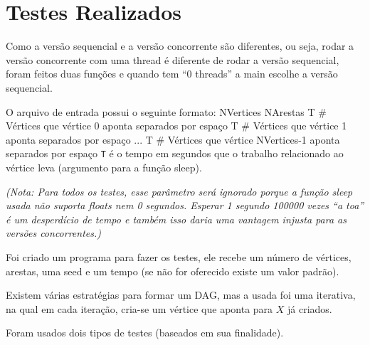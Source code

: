 \documentclass[12pt]{article}
\newenvironment{code}{\verbatim}{\endverbatim}
\newcommand{\ti}{\textit}
\begin{document}
\newpage
\section{Testes Realizados}

Como a versão sequencial e a versão concorrente são diferentes,
ou seja, rodar a versão concorrente com uma thread é diferente
de rodar a versão sequencial, foram feitos duas funções
e quando tem ``0 threads'' a main escolhe a versão sequencial.

O arquivo de entrada possui o seguinte formato:
\begin{code}
    NVertices NArestas
    T # Vértices que vértice 0 aponta separados por espaço
    T # Vértices que vértice 1 aponta separados por espaço
    ...
    T # Vértices que vértice NVertices-1 aponta separados por espaço
\end{code}
\verb.T. é o tempo em segundos que o trabalho relacionado ao vértice leva
(argumento para a função sleep).

\ti{
	(Nota:
	Para todos os testes, esse parâmetro será ignorado
	porque a função sleep usada
	não suporta floats nem 0 segundos.
	Esperar 1 segundo 100000 vezes ``a toa'' é um desperdício de tempo
	e também isso daria uma vantagem injusta para as versões concorrentes.)
}

Foi criado um programa para fazer os testes,
ele recebe um número de vértices, arestas, uma seed e um tempo
(se não for oferecido existe um valor padrão).

Existem várias estratégias para formar um DAG,
mas a usada foi uma iterativa,
na qual em cada iteração,
cria-se um vértice que aponta para $X$ já criados.

Foram usados dois tipos de testes
(baseados em sua finalidade).
\end{document}

